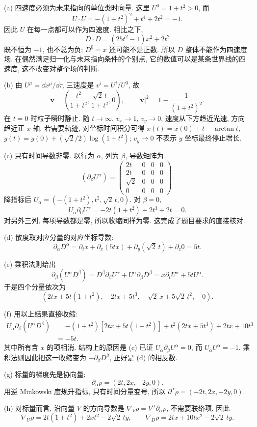 \begin{solution}
(a) 四速度必须为未来指向的单位类时向量. 这里 $U^0=1+t^2>0$, 而
\[
 U\cdot U=-(1+t^2)^2+t^4+2t^2=-1.
\]
因此 $U$ 在每一点都可以作为四速度. 相比之下,
\[
 D\cdot D=(25t^2-1)x^2+2t^2
\]
既不恒为 $-1$, 也不总为负; $D^0=x$ 还可能不是正数. 所以 $D$ 整体不能作为四速度场. 在偶然满足归一化与未来指向条件的个别点, 它的数值可以是某条世界线的四速度, 这不改变对整个场的判断.

(b) 由 $U^\mu=\dd x^\mu/\dd\tau$, 三速度是 $v^i=U^i/U^0$, 故
\[
 \boldsymbol v=\left(\frac{t^2}{1+t^2},\frac{\sqrt2\,t}{1+t^2},0\right),\qquad
 |\boldsymbol v|^2=1-\frac1{(1+t^2)^2}.
\]
在 $t=0$ 时粒子瞬时静止. 随 $t\to\infty$, $v_x\to1$, $v_y\to0$, 速度从下方趋近光速, 方向趋近正 $x$ 轴. 若需要轨迹, 对坐标时间积分可得 $x(t)=x(0)+t-\arctan t$, $y(t)=y(0)+(\sqrt2/2)\log(1+t^2)$; $v_y\to0$ 不表示 $y$ 坐标最终停止增长.

(c) 只有时间导数非零. 以行为 $\alpha$, 列为 $\beta$, 导数矩阵为
\[
 (\partial_\beta U^\alpha)=
 \begin{pmatrix}
 2t&0&0&0\\2t&0&0&0\\\sqrt2&0&0&0\\0&0&0&0
 \end{pmatrix}.
\]
降指标后 $U_\alpha=(-(1+t^2),t^2,\sqrt2\,t,0)$. 对 $\beta=0$,
\[
 U_\alpha\partial_0U^\alpha
 =-2t(1+t^2)+2t^3+2t=0.
\]
对另外三列, 每项导数都是零, 所以收缩同样为零. 这完成了题目要求的直接核对.

(d) 散度取对应分量的对应坐标导数:
\[
 \partial_\alpha D^\alpha
 =\partial_t x+\partial_x(5tx)+\partial_y(\sqrt2\,t)+\partial_z0=5t.
\]

(e) 乘积法则给出
\[
 \partial_\beta(U^\alpha D^\beta)
 =D^\beta\partial_\beta U^\alpha+U^\alpha\partial_\beta D^\beta
 =x\partial_tU^\alpha+5tU^\alpha.
\]
于是四个分量依次为
\[
 \left(2tx+5t(1+t^2),\quad 2tx+5t^3,\quad
 \sqrt2\,x+5\sqrt2\,t^2,\quad0\right).
\]

(f) 用以上结果直接收缩:
\begin{align*}
 U_\alpha\partial_\beta(U^\alpha D^\beta)
 & =-(1+t^2)[2tx+5t(1+t^2)]
     +t^2(2tx+5t^3)+2tx+10t^3\\
 &=-5t.
\end{align*}
其中所有含 $x$ 的项相消. 结构上的原因是 (c) 已证 $U_\alpha\partial_\beta U^\alpha=0$, 而 $U_\alpha U^\alpha=-1$. 乘积法则因此把这一收缩变为 $-\partial_\beta D^\beta$, 正好是 (d) 的相反数.

(g) 标量的梯度先是协向量:
\[
 \partial_\alpha\rho=(2t,2x,-2y,0).
\]
用逆 Minkowski 度规升指标, 只有时间分量变号, 所以 $\partial^\alpha\rho=(-2t,2x,-2y,0)$.

(h) 对标量而言, 沿向量 $V$ 的方向导数是 $\nabla_V\rho=V^\alpha\partial_\alpha\rho$, 不需要联络项. 因此
\[
 \nabla_U\rho=2t(1+t^2)+2xt^2-2\sqrt2\,ty,\qquad
 \nabla_D\rho=2tx+10tx^2-2\sqrt2\,ty.
\]
\end{solution}

